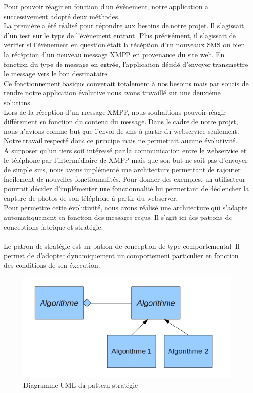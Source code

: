 Pour pouvoir réagir en fonction d'un évènement, notre application a successivement adopté deux méthodes.
\\
La première a été réalisé pour répondre aux besoins de notre projet. Il s'agissait d'un test sur le 
type de l'évènement entrant. Plus précisément, il s'agissait de vérifier si l'évènement en question 
était la récéption d'un nouveaux SMS ou bien la récéption d'un nouveau message XMPP en provenance du 
site web. En fonction du type de message en entrée, l'application décidé d'envoyer transmettre le message
vers le bon destinataire. 
\\
Ce fonctionnement basique convenait totalement à nos besoins mais par soucis de rendre notre application
évolutive nous avons travaillé sur une deuxième solutions.
\\
Lors de la réception d'un message XMPP, nous souhaitions pouvoir réagir différement en fonction du contenu
du message. Dans le cadre de notre projet, nous n'avions comme but que l'envoi de sms à partir du webservice
seulement. Notre travail respecté donc ce principe mais ne permettait aucune évolutivité.
\\
A supposer qu'un tiers soit intéressé par la communication entre le webservice et le téléphone par 
l'intermédiaire de XMPP mais que son but ne soit pas d'envoyer de simple sms, nous avons implémenté une
architecture permettant de rajouter facilement de nouvelles fonctionnalités. Pour donner des exemples, 
un utilisateur pourrait décider d'implémenter une fonctionnalité lui permettant de déclencher la capture
de photos de son téléphone à partir du webserver.
\\
Pour permettre cette évolutivité, nous avons réalisé une architecture qui s'adapte automatiquement en
fonction des messages reçus. Il s'agit ici des patrons de conceptions fabrique et stratégie. 
\\\\

Le patron de stratégie est un patron de conception de type comportemental. Il permet de d'adopter 
dynamiquement un comportement particulier en fonction des conditions de son éxecution.

\begin{figure}[H]
	\center
	\includegraphics[width=12cm]{img/pattern-strategie.png}
	\caption{Diagramme UML du pattern stratégie}
\end{figure}

